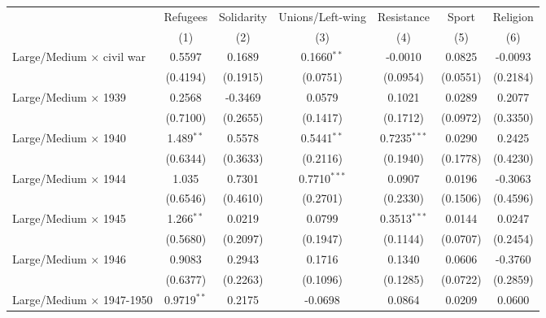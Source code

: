 
\begingroup
\centering
\begin{tabular}{lcccccc}
   \toprule
                                     & Refugees      & Solidarity    & Unions/Left-wing & Resistance     & Sport         & Religion\\  
                                     & (1)           & (2)           & (3)              & (4)            & (5)           & (6)\\  
   \midrule 
   Large/Medium $\times$ civil war   & 0.5597        & 0.1689        & 0.1660$^{**}$    & -0.0010        & 0.0825        & -0.0093\\   
                                     & (0.4194)      & (0.1915)      & (0.0751)         & (0.0954)       & (0.0551)      & (0.2184)\\   
   Large/Medium $\times$ 1939     & 0.2568        & -0.3469       & 0.0579           & 0.1021         & 0.0289        & 0.2077\\   
                                     & (0.7100)      & (0.2655)      & (0.1417)         & (0.1712)       & (0.0972)      & (0.3350)\\   
   Large/Medium $\times$ 1940        & 1.489$^{**}$  & 0.5578        & 0.5441$^{**}$    & 0.7235$^{***}$ & 0.0290        & 0.2425\\   
                                     & (0.6344)      & (0.3633)      & (0.2116)         & (0.1940)       & (0.1778)      & (0.4230)\\   
   Large/Medium $\times$ 1944        & 1.035         & 0.7301        & 0.7710$^{***}$   & 0.0907         & 0.0196        & -0.3063\\   
                                     & (0.6546)      & (0.4610)      & (0.2701)         & (0.2330)       & (0.1506)      & (0.4596)\\   
   Large/Medium $\times$ 1945        & 1.266$^{**}$  & 0.0219        & 0.0799           & 0.3513$^{***}$ & 0.0144        & 0.0247\\   
                                     & (0.5680)      & (0.2097)      & (0.1947)         & (0.1144)       & (0.0707)      & (0.2454)\\   
   Large/Medium $\times$ 1946        & 0.9083        & 0.2943        & 0.1716           & 0.1340         & 0.0606        & -0.3760\\   
                                     & (0.6377)      & (0.2263)      & (0.1096)         & (0.1285)       & (0.0722)      & (0.2859)\\   
   Large/Medium $\times$ 1947-1950   & 0.9719$^{**}$ & 0.2175        & -0.0698          & 0.0864         & 0.0209        & 0.0600\\   

\end{tabular}
